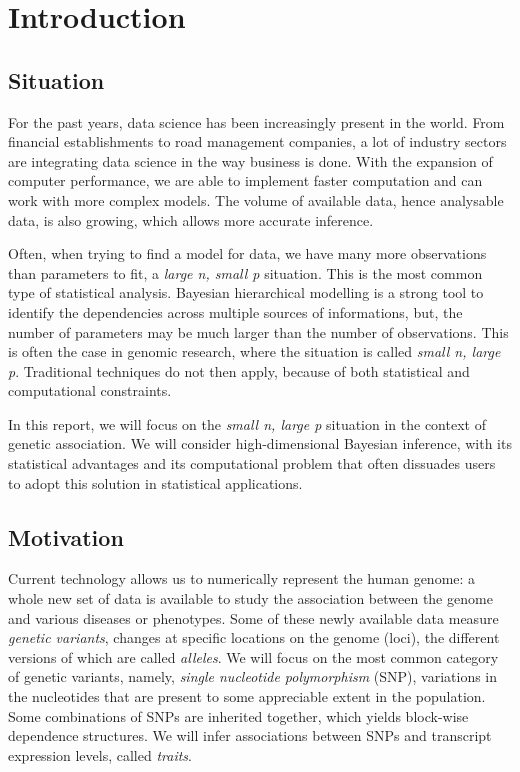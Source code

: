 \documentclass[a4paper, 11pt]{report}
\numberwithin{equation}{chapter}
\begin{document}
\chapter{Introduction}
\section{Situation}
For the past years, data science has been increasingly present in the world. From financial establishments to road management companies, a lot of industry sectors are integrating data science in the way business is done. With the expansion of computer performance, we are able to implement faster computation and can work with more complex models. The volume of available data, hence analysable data, is also growing, which allows more accurate inference.

Often, when trying to find a model for data, we have many more observations than parameters to fit, a \textit{large n, small p} situation. This is the most common type of statistical analysis. Bayesian hierarchical modelling is a strong tool to identify the dependencies across multiple sources of informations, but, the number of parameters may be much larger than the number of observations. This is often the case in genomic research, where the situation is called \textit{small n, large p}. Traditional techniques do not then apply, because of both statistical and computational constraints.

In this report, we will focus on the \textit{small n, large p} situation in the context of genetic association. We will consider high-dimensional Bayesian inference, with its statistical advantages and its computational problem that often dissuades users to adopt this solution in statistical applications.

\section{Motivation}
Current technology allows us to numerically represent the human genome: a whole new set of data is available to study the association between the genome and various diseases or phenotypes.  Some of these newly available data measure \textit{genetic variants}, changes at specific locations on  the genome (loci), the different versions of which are called \textit{alleles}. We will focus on the most common category of genetic variants, namely, \textit{single nucleotide polymorphism} (SNP), variations in the nucleotides that are present to some appreciable extent in the population. Some combinations of SNPs are inherited together, which yields block-wise dependence structures. We will infer associations between SNPs and transcript expression levels, called \textit{traits}.
\end{document}
